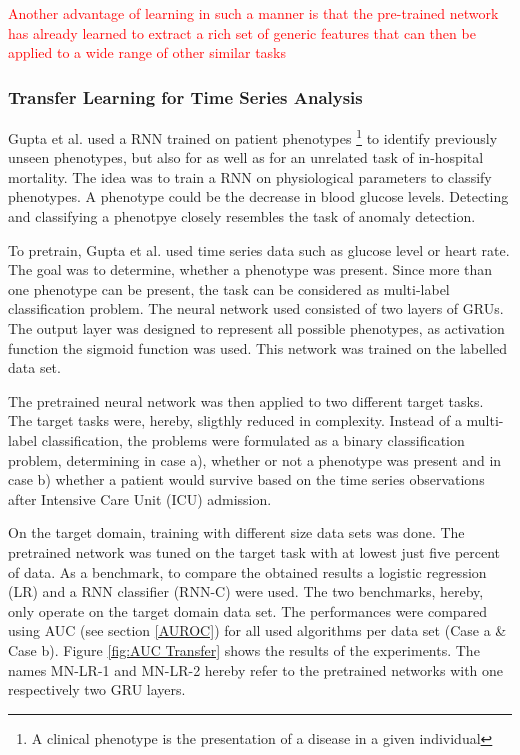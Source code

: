 \textcolor{red}{Another advantage of learning in
such a manner is that the pre-trained network has already learned
to extract a rich set of generic features that can then be applied to
a wide range of other similar tasks}


\subsubsection{Transfer Learning for Time Series Analysis}
Gupta et al. \parencite*{Gupta2018} used a RNN trained on patient phenotypes \footnote{A clinical phenotype is the presentation of a disease in a given individual} to identify previously unseen phenotypes, but also for as well as for an unrelated task of in-hospital mortality. The idea was to train a RNN on physiological parameters to classify phenotypes. A phenotype could be the decrease in blood glucose levels. Detecting and classifying a phenotpye closely resembles the task of anomaly detection.

To pretrain, Gupta et al. used time series data such as glucose level or heart rate. The goal was to determine, whether a phenotype was present. Since more than one phenotype can be present, the task can be considered as multi-label classification problem. The neural network used consisted of two layers of GRUs. The output layer was designed to represent all possible phenotypes, as activation function the sigmoid function was used. This network was trained on the labelled data set.

The pretrained neural network was then applied to two different target tasks. The target tasks were, hereby, sligthly reduced in complexity. Instead of a multi-label classification, the problems were formulated as a binary classification problem, determining in case a), whether or not a phenotype was present and in case b) whether a patient would survive based on the time series observations after Intensive Care Unit (ICU) admission.

On the target domain, training with different size data sets was done. The pretrained network was tuned on the target task with at lowest just five percent of data. As a benchmark, to compare the obtained results a logistic regression (LR) and a RNN classifier (RNN-C) were used. The two benchmarks, hereby, only operate on the target domain data set. The performances were compared using AUC (see section \ref{AUROC}) for all used algorithms per data set (Case a \& Case b). Figure \ref{fig:AUC Transfer} shows the results of the experiments. The names MN-LR-1 and MN-LR-2 hereby refer to the pretrained networks with one respectively two GRU layers.    


